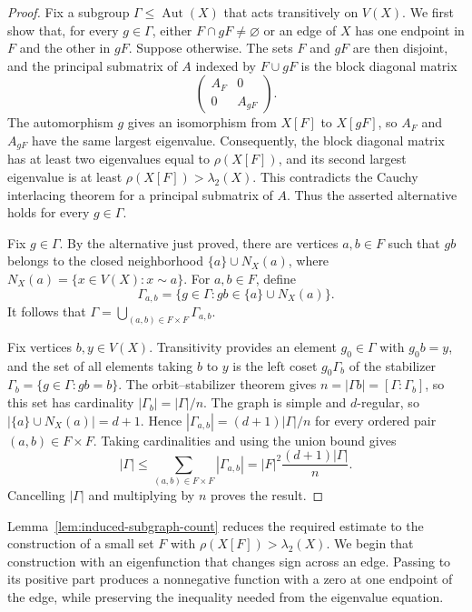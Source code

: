 \documentclass[11pt]{article}
\theoremstyle{definition}
\theoremstyle{remark}
\begin{document}
\begin{proof}
Fix a subgroup $\Gamma\leq\operatorname{Aut}(X)$ that acts transitively on $V(X)$. We first show that, for every $g\in\Gamma$, either $F\cap gF\neq\varnothing$ or an edge of $X$ has one endpoint in $F$ and the other in $gF$. Suppose otherwise. The sets $F$ and $gF$ are then disjoint, and the principal submatrix of $A$ indexed by $F\cup gF$ is the block diagonal matrix
\[
\begin{pmatrix}
A_F&0\\
0&A_{gF}
\end{pmatrix}.
\]
The automorphism $g$ gives an isomorphism from $X[F]$ to $X[gF]$, so $A_F$ and $A_{gF}$ have the same largest eigenvalue. Consequently, the block diagonal matrix has at least two eigenvalues equal to $\rho(X[F])$, and its second largest eigenvalue is at least $\rho(X[F])>\lambda_2(X)$. This contradicts the Cauchy interlacing theorem for a principal submatrix of $A$. Thus the asserted alternative holds for every $g\in\Gamma$.

Fix $g\in\Gamma$. By the alternative just proved, there are vertices $a,b\in F$ such that $gb$ belongs to the closed neighborhood $\{a\}\cup N_X(a)$, where $N_X(a)=\{x\in V(X):x\sim a\}$. For $a,b\in F$, define
\[
\Gamma_{a,b}=\{g\in\Gamma:gb\in\{a\}\cup N_X(a)\}.
\]
It follows that $\Gamma=\bigcup_{(a,b)\in F\times F}\Gamma_{a,b}$.

Fix vertices $b,y\in V(X)$. Transitivity provides an element $g_0\in\Gamma$ with $g_0b=y$, and the set of all elements taking $b$ to $y$ is the left coset $g_0\Gamma_b$ of the stabilizer $\Gamma_b=\{g\in\Gamma:gb=b\}$. The orbit--stabilizer theorem gives $n=|\Gamma b|=[\Gamma:\Gamma_b]$, so this set has cardinality $|\Gamma_b|=|\Gamma|/n$. The graph is simple and $d$-regular, so $|\{a\}\cup N_X(a)|=d+1$. Hence $|\Gamma_{a,b}|=(d+1)|\Gamma|/n$ for every ordered pair $(a,b)\in F\times F$. Taking cardinalities and using the union bound gives
\[
|\Gamma|\leq\sum_{(a,b)\in F\times F}|\Gamma_{a,b}|=|F|^2\frac{(d+1)|\Gamma|}{n}.
\]
Cancelling $|\Gamma|$ and multiplying by $n$ proves the result.
\end{proof}

Lemma~\ref{lem:induced-subgraph-count} reduces the required estimate to the construction of a small set $F$ with $\rho(X[F])>\lambda_2(X)$. We begin that construction with an eigenfunction that changes sign across an edge. Passing to its positive part produces a nonnegative function with a zero at one endpoint of the edge, while preserving the inequality needed from the eigenvalue equation.
\end{document}
